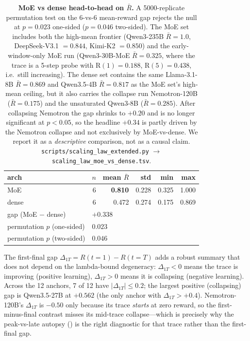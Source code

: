 \begin{table}[t]
  \centering
  \small
  \begin{tabular}{lrrrrr}
    \toprule
    arch & $n$ & mean $\bar R$ & std & min & max \\
    \midrule
    MoE    & 6 & \textbf{0.810} & 0.228 & 0.325 & 1.000 \\
    dense  & 6 & 0.472           & 0.274 & 0.175 & 0.869 \\
    \midrule
    gap (MoE $-$ dense)        & \multicolumn{5}{l}{$+0.338$} \\
    permutation $p$ (one-sided) & \multicolumn{5}{l}{$\mathbf{0.023}$} \\
    permutation $p$ (two-sided) & \multicolumn{5}{l}{$0.046$} \\
    \bottomrule
  \end{tabular}
  \caption{\textbf{MoE vs dense head-to-head on $\bar R$.}
    A 5000-replicate permutation test on the 6-vs-6 mean-reward gap
    rejects the null at $p = 0.023$ one-sided ($p = 0.046$
    two-sided).  The MoE set includes both the high-mean frontier
    (Qwen3-235B $\bar R = 1.0$, DeepSeek-V3.1 $= 0.844$, Kimi-K2
    $= 0.850$) and the early-window-only MoE run
    (Qwen3-30B-MoE $\bar R = 0.325$, where the trace is a 5-step
    probe with R$(1) = 0.188$, R$(5) = 0.438$, i.e.\ still
    increasing).  The dense set contains the same Llama-3.1-8B
    $\bar R = 0.869$ and Qwen3.5-4B $\bar R = 0.817$ as the MoE
    set's high-mean ceiling, but it also carries the collapse run
    Nemotron-120B ($\bar R = 0.175$) and the unsaturated
    Qwen3-8B ($\bar R = 0.285$).  After collapsing Nemotron the gap
    shrinks to $+0.20$ and is no longer significant at $p < 0.05$,
    so the headline $+0.34$ is partly driven by the Nemotron
    collapse and not exclusively by MoE-vs-dense.  We report it
    as a \emph{descriptive} comparison, not as a causal claim.
    \texttt{scripts/scaling\_law\_extended.py}
    $\to$ \texttt{scaling\_law\_moe\_vs\_dense.tsv}.}
  \label{tab:scaling-moe-vs-dense}
\end{table}

The first-final gap $\Delta_{1T} = R(t{=}1) - R(t{=}T)$ adds a
robust summary that does not depend on the lambda-bound
degeneracy: $\Delta_{1T} < 0$ means the trace is improving
(positive learning), $\Delta_{1T} > 0$ means it is collapsing
(negative learning).  Across the 12 anchors, 7 of 12 have
$|\Delta_{1T}| \le 0.2$; the largest positive (collapsing) gap is
Qwen3.5-27B at $+0.562$ (the only anchor with $\Delta_{1T} > +0.4$).
Nemotron-120B's $\Delta_{1T}$ is $-0.50$ only because its trace
\emph{starts} at zero reward, so the first-minus-final contrast
misses its mid-trace collapse---which is precisely why the
peak-vs-late autopsy () is
the right diagnostic for that trace rather than the first-final gap.

